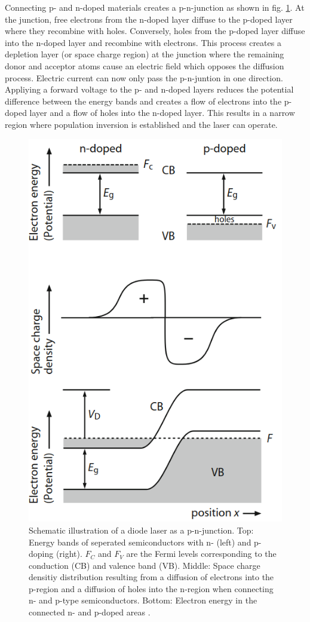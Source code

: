 Connecting p- and n-doped materials creates a p-n-junction as shown in fig. \ref{fig:semiconductor}. At the junction, free electrons from the n-doped layer diffuse 
to the p-doped layer where they recombine with holes. Conversely, holes from the p-doped layer diffuse into the n-doped layer
and recombine with electrons. This process creates a depletion layer (or space charge region) at the junction where the remaining
donor and acceptor atoms cause an electric field which opposes the diffusion process. 
Electric current can now only pass the p-n-juntion in one direction. Appliying a forward voltage to the 
p- and n-doped layers reduces the potential difference between the energy bands and creates a flow of electrons 
into the p-doped layer and a flow of holes into the n-doped layer. 
This results in a narrow region where population inversion is established and the laser can operate.

\begin{figure}
    \centering
    \includegraphics[width = 0.7\linewidth]{Bilder/semiconductor.png}
    \caption{Schematic illustration of a diode laser as a p-n-junction. 
    Top: Energy bands of seperated semiconductors with n- (left) and p-doping (right). $F_C$ and $F_V$ are the Fermi levels
    corresponding to the conduction (CB) and valence band (VB).
    Middle: Space charge densitiy distribution resulting from a diffusion of 
    electrons into the p-region and a diffusion of holes into the n-region 
    when connecting n- and p-type semiconductors.
    Bottom: Electron energy in the connected n- and p-doped areas \cite{eichler}.}
    \label{fig:semiconductor}
\end{figure}

